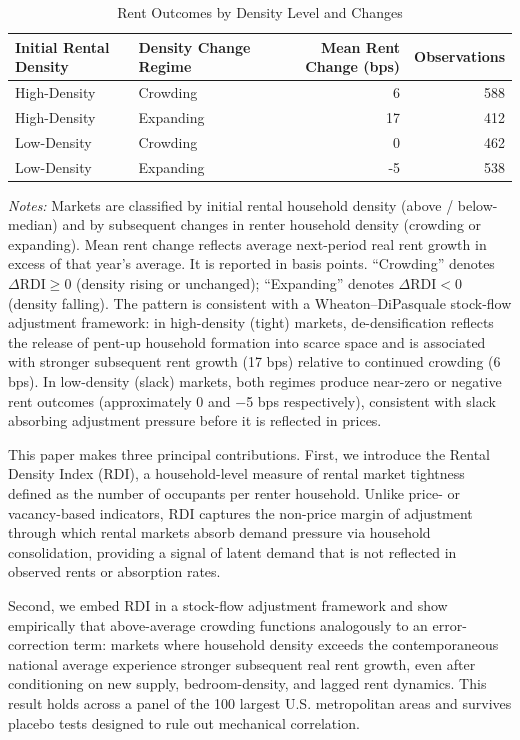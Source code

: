 \documentclass[pdflatex,sn-apa]{sn-jnl}%
\theoremstyle{thmstyleone}%
\theoremstyle{thmstyletwo}%
\theoremstyle{thmstylethree}%
\begin{document}
\begin{table}[htbp]
\centering
\caption{Rent Outcomes by Density Level and Changes }
\label{tab:wheaton_dipasquale_density}
\begin{tabular}{l l r r}
\hline
Initial Rental Density & Density Change Regime & Mean Rent Change (bps) & Observations \\
\hline
High-Density & Crowding     & 6  & 588 \\
High-Density & Expanding	& 17  & 412 \\
Low-Density  & Crowding     & 0  & 462 \\
Low-Density  & Expanding 	& -5  & 538 \\
\hline
\end{tabular}
\begin{minipage}{0.9\linewidth}
\footnotesize
\emph{Notes:} Markets are classified by initial rental household density (above / below-median) and by subsequent changes in renter household density (crowding or expanding). Mean rent change reflects average next-period real rent growth in excess of that year's average. It is reported in basis points. ``Crowding'' denotes $\Delta\text{RDI} \geq 0$ (density rising or unchanged); 
``Expanding'' denotes $\Delta\text{RDI} < 0$ (density falling). The pattern is consistent 
with a Wheaton--DiPasquale stock-flow adjustment framework: in high-density (tight) markets, 
de-densification reflects the release of pent-up household formation into scarce space and is 
associated with stronger subsequent rent growth (17 bps) relative to continued crowding (6 bps). 
In low-density (slack) markets, both regimes produce near-zero or negative rent outcomes 
(approximately 0 and $-$5 bps respectively), consistent with slack absorbing adjustment 
pressure before it is reflected in prices.
\end{minipage}
\end{table}

This paper makes three principal contributions. First, we introduce the Rental 
Density Index (RDI), a household-level measure of rental market tightness defined 
as the number of occupants per renter household. Unlike price- or vacancy-based 
indicators, RDI captures the non-price margin of adjustment through which rental 
markets absorb demand pressure via household consolidation, providing a signal of 
latent demand that is not reflected in observed rents or absorption rates.

Second, we embed RDI in a stock-flow adjustment framework and show empirically 
that above-average crowding functions analogously to an error-correction term: markets where 
household density exceeds the contemporaneous national average experience 
stronger subsequent real rent growth, even after conditioning on new supply, bedroom-density, and 
lagged rent dynamics. This result holds across a panel of the 100 largest U.S. 
metropolitan areas and survives placebo tests designed to rule out mechanical 
correlation.
\end{document}
